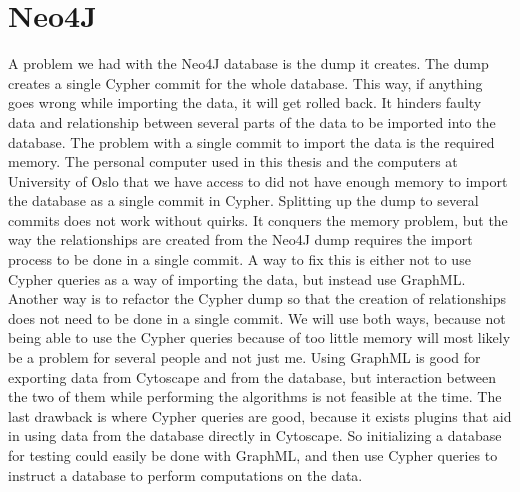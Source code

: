 \section{Neo4J}
A problem we had with the Neo4J\cite{neo4j} database is the dump it creates.
The dump creates a single Cypher\cite{cypher} commit for the whole database.
This way, if anything goes wrong while importing the data, it will get rolled
back. It hinders faulty data and relationship between several parts of the data
to be imported into the database. The problem with a single commit to import
the data is the required memory. The personal computer used in this thesis and
the computers at University of Oslo that we have access to did not have enough
memory to import the database as a single commit in Cypher. Splitting up the
dump to several commits does not work without quirks. It conquers the memory
problem, but the way the relationships are created from the Neo4J dump requires
the import process to be done in a single commit. A way to fix this is either
not to use Cypher queries as a way of importing the data, but instead use
GraphML\cite{graphml}. Another way is to refactor the Cypher dump so that the
creation of relationships does not need to be done in a single commit. We will
use both ways, because not being able to use the Cypher queries because of too
little memory will most likely be a problem for several people and not just me.
Using GraphML is good for exporting data from Cytoscape and from the database,
but interaction between the two of them while performing the algorithms is not
feasible at the time.  The last drawback is where Cypher queries are good,
because it exists plugins that aid in using data from the database directly in
Cytoscape. So initializing a database for testing could easily be done with
GraphML, and then use Cypher queries to instruct a database to perform
computations on the data.

